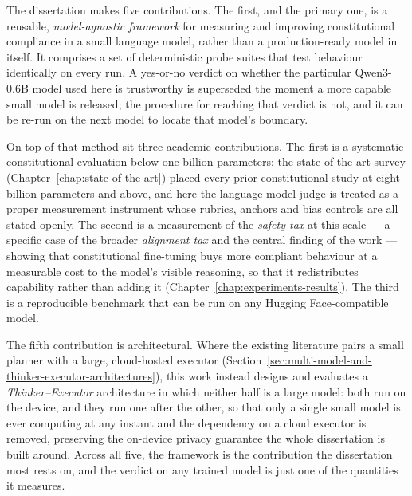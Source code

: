 The dissertation makes five contributions. The first, and the primary one, is a reusable, \emph{model-agnostic framework} for measuring and improving constitutional compliance in a small language model, rather than a production-ready model in itself. It comprises a set of deterministic probe suites that test behaviour identically on every run. A yes-or-no verdict on whether the particular Qwen3-0.6B model used here is trustworthy is superseded the moment a more capable small model is released; the procedure for reaching that verdict is not, and it can be re-run on the next model to locate that model's boundary.

On top of that method sit three academic contributions. The first is a systematic constitutional evaluation below one billion parameters: the state-of-the-art survey (Chapter~\ref{chap:state-of-the-art}) placed every prior constitutional study at eight billion parameters and above, and here the language-model judge is treated as a proper measurement instrument whose rubrics, anchors and bias controls are all stated openly. The second is a measurement of the \emph{safety tax} at this scale --- a specific case of the broader \emph{alignment tax} and the central finding of the work --- showing that constitutional fine-tuning buys more compliant behaviour at a measurable cost to the model's visible reasoning, so that it redistributes capability rather than adding it (Chapter~\ref{chap:experiments-results}). The third is a reproducible benchmark that can be run on any Hugging Face-compatible model.

The fifth contribution is architectural. Where the existing literature pairs a small planner with a large, cloud-hosted executor (Section~\ref{sec:multi-model-and-thinker-executor-architectures}), this work instead designs and evaluates a \emph{Thinker--Executor} architecture in which neither half is a large model: both run on the device, and they run one after the other, so that only a single small model is ever computing at any instant and the dependency on a cloud executor is removed, preserving the on-device privacy guarantee the whole dissertation is built around. Across all five, the framework is the contribution the dissertation most rests on, and the verdict on any trained model is just one of the quantities it measures.

